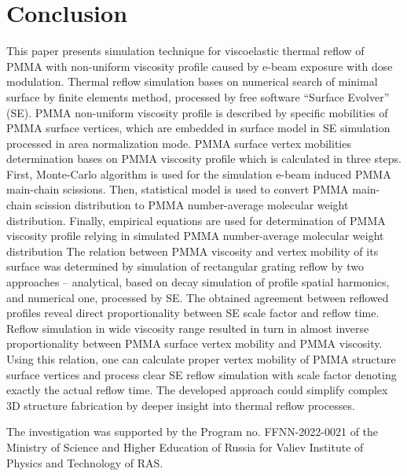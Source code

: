 \section{Conclusion} \label{conclusion}
This paper presents simulation technique for viscoelastic thermal reflow of PMMA with non-uniform viscosity profile caused by e-beam exposure with dose modulation.
Thermal reflow simulation bases on numerical search of minimal surface by finite elements method, processed by free software ``Surface Evolver'' (SE).
PMMA non-uniform viscosity profile is described by specific mobilities of PMMA surface vertices, which are embedded in surface model in SE simulation processed in area normalization mode.
PMMA surface vertex mobilities determination bases on PMMA viscosity profile which is calculated in three steps.
First, Monte-Carlo algorithm is used for the simulation e-beam induced PMMA main-chain scissions.
Then, statistical model is used to convert PMMA main-chain scission distribution to PMMA number-average molecular weight distribution.
Finally, empirical equations are used for determination of PMMA viscosity profile relying in simulated PMMA number-average molecular weight distribution
The relation between PMMA viscosity and vertex mobility of its surface was determined by simulation of rectangular grating reflow by two approaches -- analytical, based on decay simulation of profile spatial harmonics, and numerical one, processed by SE.
The obtained agreement between reflowed profiles reveal direct proportionality between SE scale factor and reflow time.
Reflow simulation in wide viscosity range resulted in turn in almost inverse proportionality between PMMA surface vertex mobility and PMMA viscosity.
Using this relation, one can calculate proper vertex mobility of PMMA structure surface vertices and process clear SE reflow simulation with scale factor denoting exactly the actual reflow time.
The developed approach could simplify complex 3D structure fabrication by deeper insight into thermal reflow processes.

\ack
The investigation was supported by the Program no. FFNN-2022-0021 of the Ministry of Science and Higher Education of Russia for Valiev Institute of Physics and Technology of RAS.
